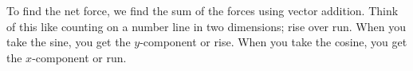 \documentclass[12pt]{report}
\begin{document}
\hspace{5cm}  \hspace{-5cm} \parbox{6.5cm}{To find the net force, we find the sum of the forces using vector addition.  Think of this like counting on a number line in two dimensions; rise over run.  When you take the sine, you get the $y$-component or rise.  When you take the cosine, you get the $x$-component or run.}
\end{document}
